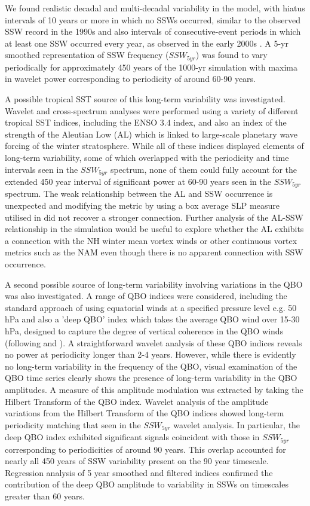 We found realistic decadal and multi-decadal variability in the model, with hiatus intervals of 10 years or more in which no SSWs occurred, similar to the observed SSW record in the 1990s \citep{pawsonCold1999b, Shindell1999} and also intervals of consecutive-event periods in which at least one SSW occurred every year, as observed in the early 2000s \citep{manneyRemarkable2005a}. A 5-yr smoothed representation of SSW frequency ($SSW_{5yr}$) was found to vary periodically for approximately 450 years of the 1000-yr simulation with maxima in wavelet power corresponding to periodicity of around 60-90 years. 

A possible tropical SST source of this long-term variability was investigated. Wavelet and cross-spectrum analyses were performed using a variety of different tropical SST indices, including the ENSO 3.4 index, and also an index of the strength of the Aleutian Low (AL) which is linked to large-scale planetary wave forcing of the winter stratosphere. While all of these indices displayed elements of long-term variability, some of which overlapped with the periodicity and time intervals seen in the $SSW_{5yr}$ spectrum, none of them could fully account for the extended 450 year interval of significant power at 60-90 years seen in the $SSW_{5yr}$ spectrum. The weak relationship between the AL and SSW occurrence is unexpected and modifying the metric by using a box average SLP measure utilised in \cite{garfinkelWhy2012b} did not recover a stronger connection. Further analysis of the AL-SSW relationship in the simulation would be useful to explore whether the AL exhibits a connection with the NH winter mean vortex winds or other continuous vortex metrics such as the NAM even though there is no apparent connection with SSW occurrence. 

A second possible source of long-term variability involving variations in the QBO was also investigated. A range of QBO indices were considered, including the standard approach of using equatorial winds at a specified pressure level e.g. 50 hPa and also a 'deep QBO' index which takes the average QBO wind over 15-30 hPa, designed to capture the degree of vertical coherence in the QBO winds (following \cite{graySurface2018b} and \cite{andrewsObserved2019d}). A straightforward wavelet analysis of these QBO indices reveals no power at periodicity longer than 2-4 years. However, while there is evidently no long-term variability in the frequency of the QBO, visual examination of the QBO time series clearly shows the presence of long-term variability in the QBO amplitudes. A measure of this amplitude modulation was extracted by taking the Hilbert Transform of the QBO index. Wavelet analysis of the amplitude variations from the Hilbert Transform of the QBO indices showed long-term periodicity matching that seen in the $SSW_{5yr}$ wavelet analysis. In particular, the deep QBO index exhibited significant signals coincident with those in $SSW_{5yr}$ corresponding to periodicities of around 90 years. This overlap accounted for nearly all 450 years of SSW variability present on the 90 year timescale. Regression analysis of 5 year smoothed and filtered indices confirmed the contribution of the deep QBO amplitude to variability in SSWs on timescales greater than 60 years. 

